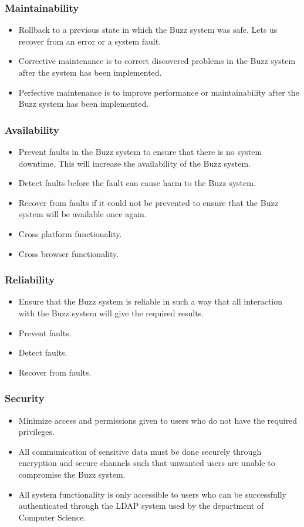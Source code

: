 \documentclass[12pt, oneside]{article}
\begin{document}
		\subsubsection{Maintainability}
			\begin{itemize}
					\item Rollback to a previous state in which the Buzz system was safe. Lets us recover from an error or a system fault.
					\item Corrective maintenance is to correct discovered problems in the Buzz system after the system has been implemented.
					\item Perfective maintenance is to improve performance or maintainability after the Buzz system has been implemented.
			\end{itemize}
		\subsubsection{Availability}
		\begin{itemize}
			\item Prevent faults in the Buzz system to ensure that there is no system downtime. This will increase the availability of the Buzz system.
			\item Detect faults before the fault can cause harm to the Buzz system.
			\item Recover from faults if it could not be prevented to ensure that the Buzz system will be available once again.
			\item Cross platform functionality.
			\item Cross browser functionality.
		\end{itemize}
		
		\subsubsection{Reliability}
		\begin{itemize}
			\item Ensure that the Buzz system is reliable in such a way that all interaction with the Buzz system will give the required results.
			\item Prevent faults.
			\item Detect faults.
			\item Recover from faults.
		\end{itemize}
	
		\subsubsection{Security}
			\begin{itemize}
				\item Minimize access and permissions given to users who do not have the required privileges.
				\item All communication of sensitive data must be done securely through encryption and secure channels such that unwanted users are unable to compromise the Buzz system.
				\item All system functionality is only accessible to users who can be successfully authenticated through the LDAP system used by the department of Computer Science.
			\end{itemize}
\end{document}
